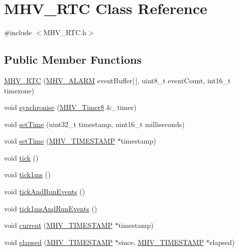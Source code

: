 \hypertarget{class_m_h_v___r_t_c}{
\section{\-M\-H\-V\-\_\-\-R\-T\-C \-Class \-Reference}
\label{class_m_h_v___r_t_c}
}


{\ttfamily \#include $<$\-M\-H\-V\-\_\-\-R\-T\-C.\-h$>$}

\subsection*{\-Public \-Member \-Functions}
\begin{DoxyCompactItemize}
\item 
\hyperlink{class_m_h_v___r_t_c_a3c7a321e22e8788eb45ba6cb3d74286b}{\-M\-H\-V\-\_\-\-R\-T\-C} (\hyperlink{_m_h_v___r_t_c_8h_af13307658f41fba330ffae04dd5cbce6}{\-M\-H\-V\-\_\-\-A\-L\-A\-R\-M} event\-Buffer\mbox{[}$\,$\mbox{]}, uint8\-\_\-t event\-Count, int16\-\_\-t timezone)
\item 
void \hyperlink{class_m_h_v___r_t_c_a97308259a62550d63eaf677190fa5581}{synchronise} (\hyperlink{class_m_h_v___timer8}{\-M\-H\-V\-\_\-\-Timer8} \&\-\_\-timer)
\item 
void \hyperlink{class_m_h_v___r_t_c_a426e7a34e8a3957d378a634c2c2d00d8}{set\-Time} (uint32\-\_\-t timestamp, uint16\-\_\-t milliseconds)
\item 
void \hyperlink{class_m_h_v___r_t_c_a7e4f42af3581cce6261f1c83d1e2b0c1}{set\-Time} (\hyperlink{_m_h_v___r_t_c_8h_a1e30d3a92b1b868286bd0d619245d8a6}{\-M\-H\-V\-\_\-\-T\-I\-M\-E\-S\-T\-A\-M\-P} $\ast$timestamp)
\item 
void \hyperlink{class_m_h_v___r_t_c_af56442a6497ade702d8eb8ba935fb1ef}{tick} ()
\item 
void \hyperlink{class_m_h_v___r_t_c_a7149adf9da9e7209cd352eb67f40bf30}{tick1ms} ()
\item 
void \hyperlink{class_m_h_v___r_t_c_a7246016a7c37aefcdf2bb46f67bbb455}{tick\-And\-Run\-Events} ()
\item 
void \hyperlink{class_m_h_v___r_t_c_a1e0b5a223fb74c10a30f7712c42081e2}{tick1ms\-And\-Run\-Events} ()
\item 
void \hyperlink{class_m_h_v___r_t_c_aa4b7a93658ea4548520103f63d5897ec}{current} (\hyperlink{_m_h_v___r_t_c_8h_a1e30d3a92b1b868286bd0d619245d8a6}{\-M\-H\-V\-\_\-\-T\-I\-M\-E\-S\-T\-A\-M\-P} $\ast$timestamp)
\item 
void \hyperlink{class_m_h_v___r_t_c_a6bd66dbb9fd2229e3b229667e38adbf6}{elapsed} (\hyperlink{_m_h_v___r_t_c_8h_a1e30d3a92b1b868286bd0d619245d8a6}{\-M\-H\-V\-\_\-\-T\-I\-M\-E\-S\-T\-A\-M\-P} $\ast$since, \hyperlink{_m_h_v___r_t_c_8h_a1e30d3a92b1b868286bd0d619245d8a6}{\-M\-H\-V\-\_\-\-T\-I\-M\-E\-S\-T\-A\-M\-P} $\ast$elapsed)

\end{DoxyCompactItemize}
